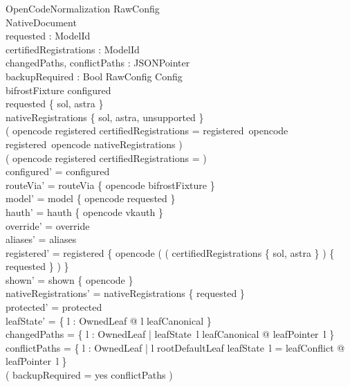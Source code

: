 \documentclass{article}
\begin{document}
\begin{schema}{OpenCodeNormalization}
	\Delta RawConfig \\
	\Delta NativeDocument \\
	requested : ModelId \\
	certifiedRegistrations : \power ModelId \\
	changedPaths, conflictPaths : \power JSONPointer \\
	backupRequired : Bool
	\where
	\theta RawConfig \in Config \\
	bifrostFixture \in configured \\
	requested \in \{ sol, astra \} \\
	nativeRegistrations \subseteq \{ sol, astra, unsupported \} \\
	( opencode \in \dom registered \implies
	certifiedRegistrations = registered~opencode \land
	registered~opencode \subseteq nativeRegistrations ) \\
	( opencode \notin \dom registered \implies
	certifiedRegistrations = \emptyset ) \\
	configured' = configured \\
	routeVia' = routeVia \oplus \{ opencode \mapsto bifrostFixture \} \\
	model' = model \oplus \{ opencode \mapsto requested \} \\
	hauth' = hauth \oplus \{ opencode \mapsto vkauth \} \\
	override' = override \\
	aliases' = aliases \\
	registered' = registered \oplus
	\{ opencode \mapsto
	( ( certifiedRegistrations \cap \{ sol, astra \} ) \cup \{ requested \} ) \} \\
	shown' = shown \oplus \{ opencode \mapsto \emptyset \} \\
	nativeRegistrations' = nativeRegistrations \cup \{ requested \} \\
	protected' = protected \\
	leafState' = \{ l : OwnedLeaf @ l \mapsto leafCanonical \} \\
	changedPaths = \{ l : OwnedLeaf | leafState~l \neq leafCanonical @
	leafPointer~l \} \\
	conflictPaths = \{ l : OwnedLeaf | l \neq rootDefaultLeaf \land
	leafState~l = leafConflict @ leafPointer~l \} \\
	( backupRequired = yes \iff conflictPaths \neq \emptyset )
\end{schema}
\end{document}
